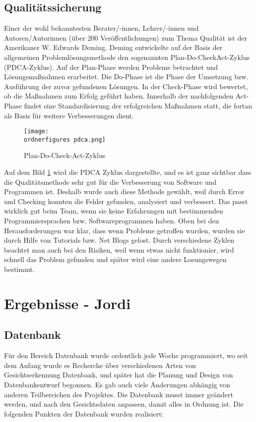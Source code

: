 \section{Qualitätssicherung}
Einer der wohl bekanntesten Berater/-innen, Lehrer/-innen und Autoren/Autorinnen (über 200
Veröffentlichungen) zum Thema Qualität ist der Amerikaner W. Edwards Deming. Deming
entwickelte auf der Basis der allgemeinen Problemlösungsmethode den sogenannten Plan-Do-CheckAct-Zyklus (PDCA-Zyklus). Auf der Plan-Phase werden Probleme betrachtet und Lösungsmaßnahmen
erarbeitet. Die Do-Phase ist die Phase der Umsetzung bzw. Ausführung der zuvor gefundenen
Lösungen. In der Check-Phase wird bewertet, ob die Maßnahmen zum Erfolg geführt haben.
Innerhalb der nachfolgenden Act-Phase findet eine Standardisierung der erfolgreichen Maßnahmen
statt, die fortan als Basis für weitere Verbesserungen dient.\cite{PDCA-Zyklus}
\bigbreak 
\begin{figure}
	\centering
	\texttt{[image: \\ordnerfigures pdca.png]}
	\caption{ Plan-Do-Check-Act-Zyklus}
	\label{fig:pdca}
	\cite{PDCA-Zyklus}
\end{figure}

Auf dem Bild \ref{fig:pdca} wird die PDCA Zyklus dargestellte, und es ist ganz sichtbar dass die Qualitätsmethode sehr gut für die Verbesserung von Software und Programmen ist. Deshalb wurde auch diese Methode gewählt, weil durch Error und Checking konnten die Fehler gefunden, analysiert und verbessert. Das passt wirklich gut beim Team, wenn sie keine Erfahrungen mit bestimmenden Programmiersprachen bzw. Softwareprogrammen haben.
\bigbreak
Oben bei den Herausforderungen war klar, dass wenn Probleme getroffen wurden, wurden sie durch Hilfe von Tutorials bzw. Net Blogs gelost. Durch verschiedene Zyklen beachtet man auch bei den Risiken, weil wenn etwas nicht funktionier, wird schnell das Problem gefunden und später wird eine andere Losungswegen bestimmt.
 
\chapter{Ergebnisse - Jordi}
\section{Datenbank}
Für den Bereich Datenbank wurde ordentlich jede Woche programmiert, wo seit dem Anfang wurde es Recherche über verschiedenen Arten von Gesichtserkennung Datenbank, und später hat die Planung und Design von Datenbankentwurf begonnen. Es gab auch viele Änderungen abhängig von anderen Teilbereichen des Projektes. Die Datenbank musst immer geändert werden, und nach den Gesichtsdaten anpassen, damit alles in Ordnung ist.
Die folgenden Punkten der Datenbank wurden realisiert:

